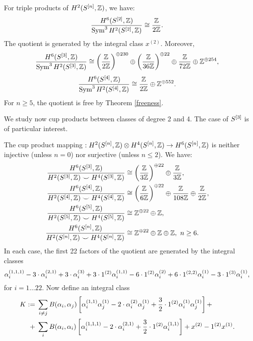\begin{proposition} For triple products of $H^2(S^{[n]},\mathbb{Z})$, we have:
$$
\frac{H^6(S^{[2]},\mathbb{Z})}{\operatorname{Sym}^3 H^2(S^{[2]},\mathbb{Z})} \cong 
\frac{\mathbb{Z}}{2\mathbb{Z}}.
$$
The quotient is generated by the integral class $x^{(2)}$. Moreover,
$$
\frac{H^6(S^{[3]},\mathbb{Z})}{\operatorname{Sym}^3 H^2(S^{[3]},\mathbb{Z})} \cong  \left(\frac{\mathbb{Z}}{2\mathbb{Z}}\right)^{\oplus 230}\oplus \left(\frac{\mathbb{Z}}{36\mathbb{Z}}\right)^{\oplus 22}\oplus \frac{\mathbb{Z}}{72\mathbb{Z}} \oplus \mathbb{Z}^{\oplus 254},
$$
$$
\frac{H^6(S^{[4]},\mathbb{Z})}{\operatorname{Sym}^3 H^2(S^{[4]},\mathbb{Z})} \cong  \frac{\mathbb{Z}}{2\mathbb{Z}} \oplus \mathbb{Z}^{\oplus 552}.
$$
For $n\geq 5$, the quotient is free by Theorem \ref{freeness}.
\end{proposition}
We study now cup products between classes of degree 2 and 4. The case of $S^{[3]}$ is of particular interest.
\begin{proposition} \label{p24}The cup product mapping $ : H^2(S^{[n]},\mathbb{Z})\otimes H^4(S^{[n]},\mathbb{Z}) \rightarrow H^6(S^{[n]},\mathbb{Z}) $ is neither injective (unless $n=0$) nor surjective (unless $n\leq 2$). We have:
\setcounter{equation}{0} 
\begin{align} 
\frac{H^6(S^{[3]},\mathbb{Z})}{H^2(S^{[3]},\mathbb{Z})\smile H^4(S^{[3]},\mathbb{Z})} &\cong \left(\frac{\mathbb{Z}}{3\mathbb{Z}}\right)^{\oplus 22} \oplus \frac{\mathbb{Z}}{3\mathbb{Z}},
\\
\frac{H^6(S^{[4]},\mathbb{Z})}{H^2(S^{[4]},\mathbb{Z})\smile H^4(S^{[4]},\mathbb{Z})} &\cong  \left(\frac{\mathbb{Z}}{6\mathbb{Z}}\right)^{\oplus 22}\oplus\frac{\mathbb{Z}}{108\mathbb{Z}} \oplus\frac{\mathbb{Z}}{2\mathbb{Z}} ,
\\
\frac{H^6(S^{[5]},\mathbb{Z})}{H^2(S^{[5]},\mathbb{Z})\smile H^4(S^{[5]},\mathbb{Z})} &\cong 
 \mathbb{Z}^{\oplus 22} \oplus \mathbb{Z},
\\
\frac{H^6(S^{[n]},\mathbb{Z})}{H^2(S^{[n]},\mathbb{Z})\smile H^4(S^{[n]},\mathbb{Z})} &\cong 
 \mathbb{Z}^{\oplus 22} \oplus \mathbb{Z}\oplus\mathbb{Z}, \ n\geq 6.
\end{align}
In each case, the first 22 factors of the quotient are generated by the integral classes 
 $$
\alpha_i^{(1,1,1)} -3\cdot \alpha_i^{(2,1)} + 3\cdot \alpha_i^{(3)}+ 3 \cdot 1^{(2)}\alpha_i^{(1,1)} -6\cdot 1^{(2)}\alpha_i^{(2)}+6\cdot 1^{(2,2)}\alpha_i^{(1)}-3\cdot 1^{(3)}\alpha_i^{(1)},
$$ 
for $ i=1\ldots 22$. Now define an integral class
\begin{align*}
K:=&\;\sum_{i\neq j} B(\alpha_i,\alpha_j)\left[\alpha_i^{(1,1)}\alpha_j^{(1)} - 2\cdot\alpha_i^{(2)}\alpha_j^{(1)}+\frac{3}{2}\cdot \One^{(2)}\alpha_i^{(1)}\alpha_j^{(1)} \right] +\\
+&\;\sum_{i}B(\alpha_i,\alpha_i)\left[\alpha_i^{(1,1,1)} - 2\cdot\alpha_i^{(2,1)} + \frac{3}{2}\cdot \One^{(2)}\alpha_i^{(1,1)} \right]+  x^{(2)}-\One^{(2)}x^{(1)}.

\end{align*}
\end{proposition}

